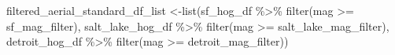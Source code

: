 \documentclass[
  letterpaper,
  DIV=11,
  numbers=noendperiod]{scrreprt}
\newenvironment{Shaded}{\begin{snugshade}}{\end{snugshade}}
\newcommand{\FunctionTok}[1]{\textcolor[rgb]{0.28,0.35,0.67}{#1}}
\newcommand{\NormalTok}[1]{\textcolor[rgb]{0.00,0.23,0.31}{#1}}
\newcommand{\OtherTok}[1]{\textcolor[rgb]{0.00,0.23,0.31}{#1}}
\newcommand{\SpecialCharTok}[1]{\textcolor[rgb]{0.37,0.37,0.37}{#1}}
\begin{document}
\begin{Shaded}
\begin{Highlighting}[]
\NormalTok{filtered\_aerial\_standard\_df\_list }\OtherTok{\textless{}{-}}\FunctionTok{list}\NormalTok{(sf\_hog\_df }\SpecialCharTok{\%\textgreater{}\%}
                                   \FunctionTok{filter}\NormalTok{(mag }\SpecialCharTok{\textgreater{}=}\NormalTok{ sf\_mag\_filter),}
\NormalTok{                                 salt\_lake\_hog\_df }\SpecialCharTok{\%\textgreater{}\%}
                                   \FunctionTok{filter}\NormalTok{(mag }\SpecialCharTok{\textgreater{}=}\NormalTok{ salt\_lake\_mag\_filter), }
\NormalTok{                                 detroit\_hog\_df }\SpecialCharTok{\%\textgreater{}\%}
                                   \FunctionTok{filter}\NormalTok{(mag }\SpecialCharTok{\textgreater{}=}\NormalTok{ detroit\_mag\_filter))}
\end{Highlighting}
\end{Shaded}
\end{document}
